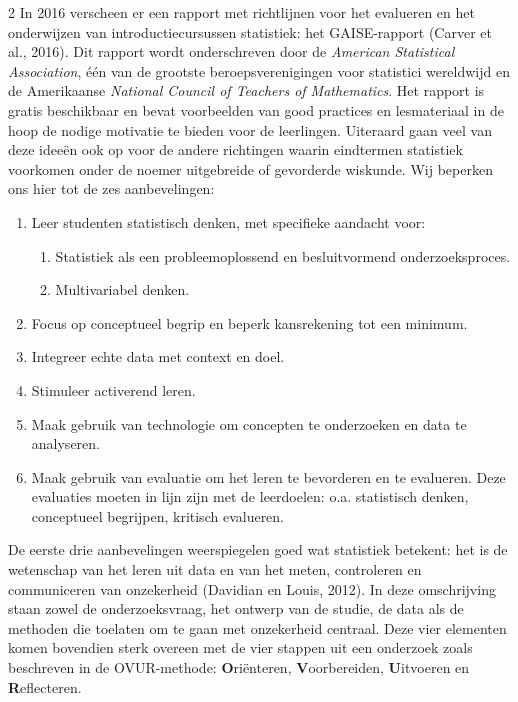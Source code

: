 \begin{multicols}{2}
    In 2016 verscheen er een rapport met richtlijnen voor het evalueren en het onderwijzen van introductiecursussen statistiek: het GAISE-rapport (Carver et al., 2016). Dit rapport wordt onderschreven door de \emph{American Statistical Association}, \'e\'en van de grootste beroepsverenigingen voor statistici wereldwijd en de Amerikaanse \emph{National Council of Teachers of Mathematics}. Het rapport is gratis beschikbaar en bevat voorbeelden van good practices en lesmateriaal in de hoop de nodige motivatie te bieden voor de leerlingen. Uiteraard gaan veel van deze idee\"en ook op voor de andere richtingen waarin eindtermen statistiek voorkomen onder de noemer uitgebreide of gevorderde wiskunde. Wij beperken ons hier tot de zes aanbevelingen: 

\begin{enumerate}
    \item Leer studenten statistisch denken, met specifieke aandacht voor: 
    \begin{enumerate}
        \item Statistiek als een probleemoplossend en besluitvormend onderzoeksproces. 
        \item Multivariabel denken. 
    \end{enumerate}
    \item Focus op conceptueel begrip en beperk kansrekening tot een minimum.
    \item Integreer echte data met context en doel. 
    \item Stimuleer activerend leren. 
    \item Maak gebruik van technologie om concepten te onderzoeken en data te analyseren. 
    \item Maak gebruik van evaluatie om het leren te bevorderen en te evalueren. Deze evaluaties moeten in lijn zijn met de leerdoelen: o.a. statistisch denken, conceptueel begrijpen, kritisch evalueren. \\
\end{enumerate}

De eerste drie aanbevelingen weerspiegelen goed wat statistiek betekent: het is de wetenschap van het leren uit data en van het meten, controleren en communiceren van onzekerheid (Davidian en Louis, 2012). In deze omschrijving staan zowel de onderzoeksvraag, het ontwerp van de studie, de data als de methoden die toelaten om te gaan met onzekerheid centraal. Deze vier elementen komen bovendien sterk overeen met de vier stappen uit een onderzoek zoals beschreven in de OVUR-methode: \textbf{O}ri\"enteren, \textbf{V}oorbereiden, \textbf{U}itvoeren en \textbf{R}eflecteren. 


\end{multicols}
